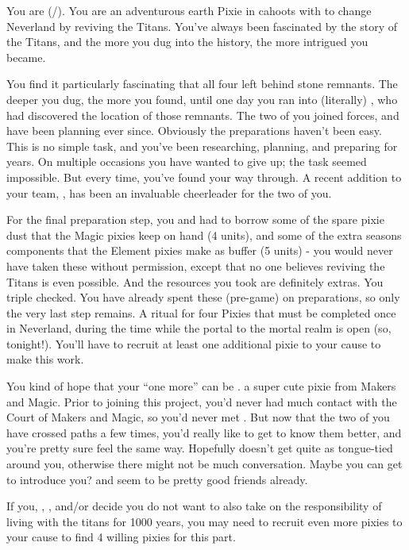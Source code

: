 \documentclass[char]{PP}
\begin{document}
\name{\cETitan{}}

You are \cETitan{} (\cETitan{\They}/\cETitan{\Them}). You are an adventurous earth Pixie in cahoots with \cFTitan{} to change Neverland by reviving the Titans. You’ve always been fascinated by the story of the Titans, and the more you dug into the history, the more intrigued you became. 

You find it particularly fascinating that all four left behind stone remnants. The deeper you dug, the more you found, until one day you ran into (literally) \cFTitan{}, who had discovered the location of those remnants. The two of you joined forces, and have been planning ever since. Obviously the preparations haven’t been easy. This is no simple task, and you’ve been researching, planning, and preparing for years. On multiple occasions you have wanted to give up; the task seemed impossible. But every time, you’ve found your way through. A recent addition to your team, \cEAirship{}, has been an invaluable cheerleader for the two of you.

For the final preparation step, you and \cETitan{} had to borrow some of the spare pixie dust that the Magic pixies keep on hand (4 units), and some of the extra seasons components that the Element pixies make as buffer (5 units) - you would never have taken these without permission, except that no one believes reviving the Titans is even possible. And the resources you took are definitely extras. You triple checked. You have already spent these (pre-game) on preparations, so only the very last step remains. A ritual for four Pixies that must be completed once in Neverland, during the time while the portal to the mortal realm is open (so, tonight!). You’ll have to recruit at least one additional pixie to your cause to make this work.

You kind of hope that your “one more” can be \cMAirship{}. \cMAirship{\Theyare} a super cute pixie from Makers and Magic. Prior to \cEAirship{} joining this project, you’d never had much contact with the Court of Makers and Magic, so you’d never met \cMAirship{}. But now that the two of you have crossed paths a few times, you’d really like to get to know them better, and you’re pretty sure \cMAirship{\they} feel\cMAirship{\verbs} the same way. Hopefully \cMAirship{} doesn’t get quite as tongue-tied around you, otherwise there might not be much conversation. Maybe you can get \cEAirship{} to introduce you? \cEAirship{} and \cMAirship{} seem to be pretty good friends already.

If you, \cFTitan{}, \cEAirship{}, and/or \cMAirship{} decide you do not want to also take on the responsibility of living with the titans for 1000 years, you may need to recruit even more pixies to your cause to find 4 willing pixies for this part.
 
\end{document}
